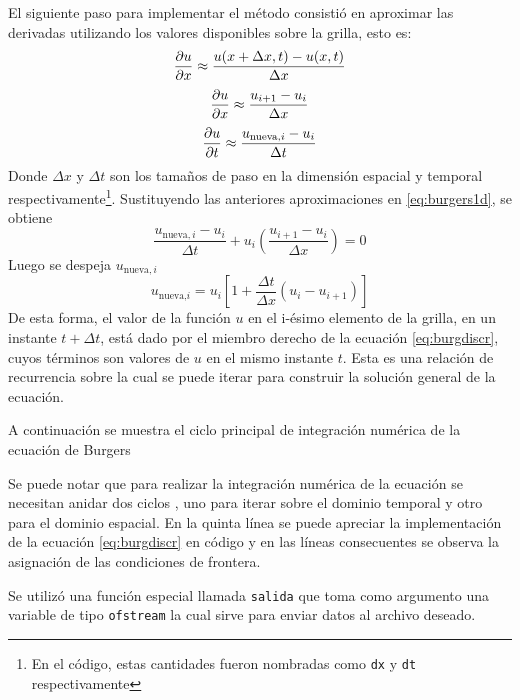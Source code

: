 \documentclass[12pt]{article}
\begin{document}
	El siguiente paso para implementar el método consistió en aproximar las derivadas utilizando los valores disponibles sobre la grilla, esto es:
	\begin{equation}
		\pdv{u}{x} \approx \frac{u(x+\Delta x,t)-u(x,t)}{\Delta x}
	\end{equation}
	\begin{equation}
		\pdv{u}{x} \approx \frac{u_{i+1}-u_{i}}{\Delta x}
	\end{equation}
	\begin{equation}
		\pdv{u}{t} \approx \frac{u_{\text{nueva},i}-u_{i}}{\Delta t}
	\end{equation}
	Donde $\Delta x$ y $\Delta t$ son los tamaños de paso en la dimensión espacial y temporal respectivamente\footnote{En el código, estas cantidades fueron nombradas como \texttt{dx} y \texttt{dt} respectivamente}. Sustituyendo las anteriores aproximaciones en \ref{eq:burgers1d}, se obtiene
	\begin{equation}
		\frac{u_{\text{nueva},i}-u_{i}}{\Delta t}+u_{i}\left( \frac{u_{i+1}-u_{i}}{\Delta x}\right) =0
	\end{equation}
	Luego se despeja $u_{\text{nueva},i}$
	\begin{equation}
		u_{\text{nueva,}i} = u_{i}\left[ 1 + \frac{\Delta t}{\Delta x}(u_{i}-u_{i+1}) \right]
		\label{eq:burgdiscr}
	\end{equation}
	De esta forma, el valor de la función $u$ en el i-ésimo elemento de la grilla, en un instante $t + \Delta t$, está dado por el miembro derecho de la ecuación \ref{eq:burgdiscr}, cuyos términos son valores de $u$ en el mismo instante $t$. Esta es una relación de recurrencia sobre la cual se puede iterar para construir la solución general de la ecuación.
	
	A continuación se muestra el ciclo principal de integración numérica de la ecuación de Burgers
	
	
	Se puede notar que para realizar la integración numérica de la ecuación se necesitan anidar dos ciclos \texttt{\color{blue}{for}}, uno para iterar sobre el dominio temporal y otro para el dominio espacial. En la quinta línea se puede apreciar la implementación de la ecuación \ref{eq:burgdiscr} en código y en las líneas consecuentes se observa la asignación de las condiciones de frontera.
	
	Se utilizó una función especial llamada \texttt{salida} que toma como argumento una variable de tipo \texttt{ofstream} la cual sirve para enviar datos al archivo deseado.
	
\end{document}
